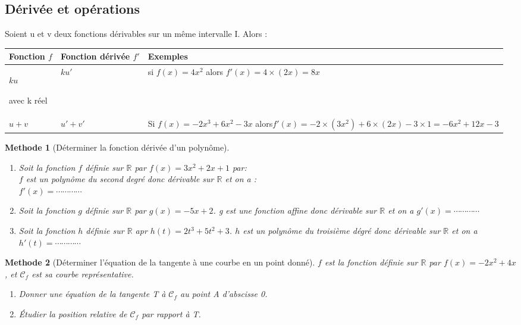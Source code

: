 \documentclass[10pt,a4paper]{article}
\def\R{{\mathbb R}}
\renewcommand{\arraystretch}{0.7}
\theoremstyle{break}
\newtheorem{Meth}{Methode}
\begin{document}
\subsection{Dérivée et opérations}
Soient u et v deux fonctions dérivables sur un même intervalle I. Alors :
\vspace*{0.5cm}\\
\begin{center}
\renewcommand{\arraystretch}{1.5}
\begin{tabular}{|p{4cm}|p{4cm}|p{8cm}|}
	\hline
	Fonction $f$&Fonction dérivée $f'$&Exemples\\
	\hline
	$ku$ \par avec k réel&$ku'$& si $f(x)=4x^2$ alors $f'(x)=4\times(2x)=8x$\\
	\hline
	$u+v$&$u'+v'$&Si $f(x)=-2x^3+6x^2-3x$ alors\newline $f'(x)=-2\times(3x^2)+6\times(2x)-3\times1=-6x^2+12x-3$\\

	\hline
\end{tabular}
\end{center}
\begin{Meth}[Déterminer la fonction dérivée d'un polynôme]
	\begin{enumerate}
		\item Soit la fonction $f$ définie sur $\R$ par  $f(x)=3x^2+2x+1$ par:\\
				$f$ est un polynôme du second degré donc dérivable sur $\R$ et on a  :\\
		$f'(x) =\cdots\cdots\cdots\cdots$
		\item Soit la fonction $g$ définie sur $\R$ par $g(x)=-5x+2$. g est une fonction affine donc dérivable sur $\R$ et on a $g'(x)=\cdots\cdots\cdots\cdots$
		\item Soit la fonction $h$ définie sur $\R$ apr $h(t)=2t^3+5t^2+3$. $h$ est un polynôme du troisième dégré donc dérivable sur $\R$ et on a $h'(t)=\cdots\cdots\cdots\cdots$
	\end{enumerate}
	\end{Meth}
\begin{Meth}[Déterminer l'équation de la tangente à une courbe en un point donné]
		 $f$ est la fonction définie sur $\R$ par $f(x) =-2x^2+4x$, et $\mathcal{C}_f$ est sa courbe représentative. 
		 \begin{enumerate}
		 	\item Donner une équation de la tangente T à $\mathcal{C}_f$ au point A d’abscisse 0.
		 	\item Étudier la position relative de $\mathcal{C}_f$ par rapport à T.
		 		 \end{enumerate}
\end{Meth}
\end{document}
